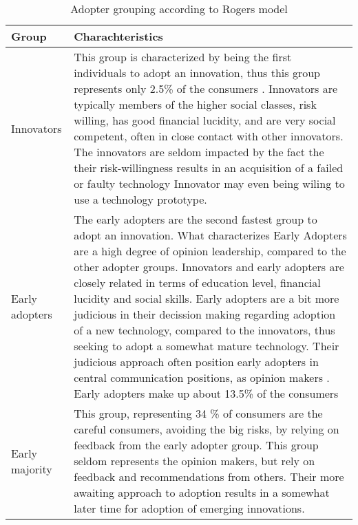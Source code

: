 \documentclass[conference]{IEEEtran}
\begin{document}
\begin{table}[ht]

\caption{Adopter grouping according to Rogers model} %

\centering  %

\begin{tabular}{|p{2cm} |p{5.5cm}|} %

\hline\hline                        %

Group & Charachteristics\\ [0.5ex] %


\hline                  %

Innovators &			%
This group is characterized by being the first individuals to adopt 
an innovation, thus this group represents only 2.5\% of the consumers \cite{diffusion2}. 
Innovators are typically members of the higher social classes, 
risk willing, has good financial lucidity, and are very social competent, 
often in close contact with other innovators. 
The innovators are seldom impacted by the fact the their risk-willingness results in an acquisition of a failed or faulty technology \cite{rogers_model} 
Innovator may even being wiling to use a technology prototype.  \\ %
\hline

Early adopters & 
The early adopters are the second fastest group to adopt an innovation. What characterizes Early Adopters are a high degree of opinion leadership, compared to the other adopter groups. Innovators and early adopters are closely related in terms of education level, financial lucidity and social skills. Early adopters are a bit more judicious in their decission making regarding adoption of a new technology, compared to the innovators, thus seeking to adopt a somewhat mature technology. Their judicious approach often position early adopters in central communication positions, as opinion makers \cite{rogers_model}.
Early adopters make up about 13.5\% of the consumers \cite{diffusion2} \\
\hline

Early majority &  
This group, representing 34 \% of consumers \cite{diffusion2} are the careful consumers, avoiding the big risks, by relying on feedback from the early adopter group. 
This group seldom represents the opinion makers, but rely on feedback and recommendations from others. Their more awaiting approach to adoption results in a somewhat later time for adoption of emerging innovations\cite{rogers_model}.\\
\hline


\end{tabular}
\end{table}
\end{document}
